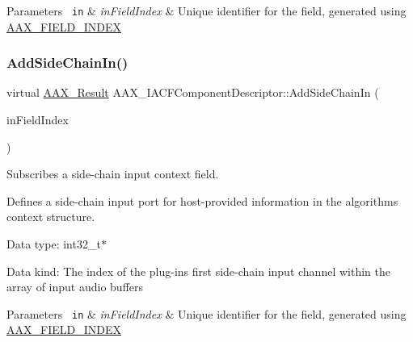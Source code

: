 \begin{DoxyParams}[1]{Parameters}
\mbox{\texttt{ in}}  & {\em in\+Field\+Index} & Unique identifier for the field, generated using \mbox{\hyperlink{a00392_acf807247ecd6e5899dc9dc31644e9a1d}{A\+A\+X\+\_\+\+F\+I\+E\+L\+D\+\_\+\+I\+N\+D\+EX}} \\
\hline
\end{DoxyParams}
\mbox{\label{a01625_ac88f0100827278c2f9bfae2f74ae103f}} 
\subsubsection{\texorpdfstring{AddSideChainIn()}{AddSideChainIn()}}
{\footnotesize\ttfamily virtual \mbox{\hyperlink{a00392_a4d8f69a697df7f70c3a8e9b8ee130d2f}{A\+A\+X\+\_\+\+Result}} A\+A\+X\+\_\+\+I\+A\+C\+F\+Component\+Descriptor\+::\+Add\+Side\+Chain\+In (\begin{DoxyParamCaption}\item[{\mbox{\hyperlink{a00392_ae807f8986143820cfb5d6da32165c9c7}{A\+A\+X\+\_\+\+C\+Field\+Index}}}]{in\+Field\+Index }\end{DoxyParamCaption})\hspace{0.3cm}{\ttfamily [pure virtual]}}



Subscribes a side-\/chain input context field. 

Defines a side-\/chain input port for host-\/provided information in the algorithm\textquotesingle{}s context structure.


\begin{DoxyItemize}
\item Data type\+: int32\+\_\+t$\ast$
\item Data kind\+: The index of the plug-\/in\textquotesingle{}s first side-\/chain input channel within the array of input audio buffers
\end{DoxyItemize}


\begin{DoxyParams}[1]{Parameters}
\mbox{\texttt{ in}}  & {\em in\+Field\+Index} & Unique identifier for the field, generated using \mbox{\hyperlink{a00392_acf807247ecd6e5899dc9dc31644e9a1d}{A\+A\+X\+\_\+\+F\+I\+E\+L\+D\+\_\+\+I\+N\+D\+EX}} \\
\hline
\end{DoxyParams}
\mbox{\label{a01625_af15ea360a7e581ac796b95b473057dad}} 
